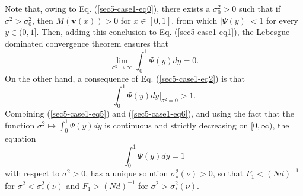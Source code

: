 \documentclass[11pt]{article}
\begin{document}
Note that, owing to Eq. (\ref{sec5-case1-eq0}), there exists a $\sigma^2_0>0$ such that if 
$\sigma^2>\sigma^2_0$, then $M(\mathbf{v}(x))>0$ for $x\in[0,1]$, from which $|\Psi(y)|<1$ for every $y\in (0,1]$. Then, adding this conclusion to Eq. (\ref{sec5-case1-eq1}), the Lebesgue dominated convergence theorem ensures that
\begin{equation}\label{sec5-case1-eq5}
\lim_{\sigma^2\rightarrow\infty}\int_{0}^{1}\Psi(y)dy=0.
\end{equation}
On the other hand, a consequence of Eq. (\ref{sec5-case1-eq2}) is that
\begin{equation}\label{sec5-case1-eq6}
\int_{0}^{1}\Psi(y)dy|_{\sigma^2=0}>1.
\end{equation}
Combining  (\ref{sec5-case1-eq5}) and (\ref{sec5-case1-eq6}), and using the fact that the function $\sigma^2\longmapsto\int_{0}^{1}\Psi(y)dy$ is continuous and strictly decreasing on $[0,\infty)$, the equation
\begin{equation}
\int_{0}^{1}\Psi(y)dy=1
\end{equation}
with respect to $\sigma^2>0$,
has a unique solution $\sigma^2_{*}(\nu)>0$,
so that  $F_1<(Nd)^{-1}$ for $\sigma^2<\sigma^2_{*}(\nu)$ and $F_1>(Nd)^{-1}$ for $\sigma^2>\sigma^2_{*}(\nu)$.
\end{document}
